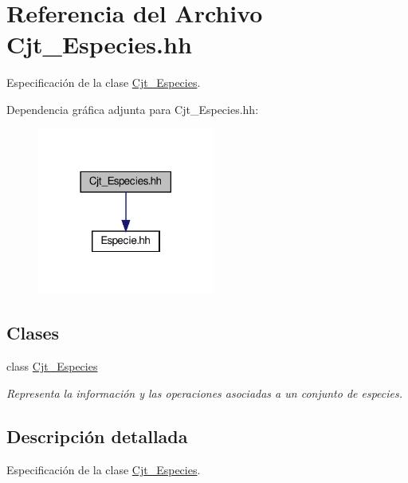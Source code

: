 \hypertarget{_cjt___especies_8hh}{}\section{Referencia del Archivo Cjt\+\_\+\+Especies.\+hh}
\label{_cjt___especies_8hh}


Especificación de la clase \hyperlink{class_cjt___especies}{Cjt\+\_\+\+Especies}.  


Dependencia gráfica adjunta para Cjt\+\_\+\+Especies.\+hh\+:\nopagebreak
\begin{figure}[H]
\begin{center}
\leavevmode
\includegraphics[width=165pt]{_cjt___especies_8hh__incl}
\end{center}
\end{figure}
\subsection*{Clases}
\begin{DoxyCompactItemize}
\item 
class \hyperlink{class_cjt___especies}{Cjt\+\_\+\+Especies}
\begin{DoxyCompactList}\small\item\em Representa la información y las operaciones asociadas a un conjunto de especies. \end{DoxyCompactList}\end{DoxyCompactItemize}


\subsection{Descripción detallada}
Especificación de la clase \hyperlink{class_cjt___especies}{Cjt\+\_\+\+Especies}. 

